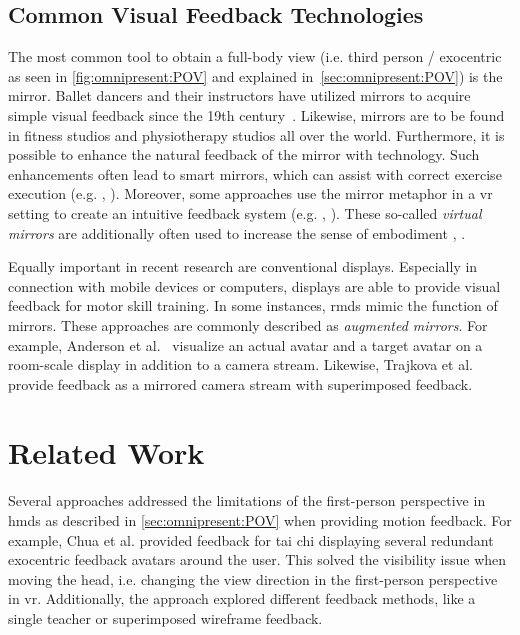 \subsection{Common Visual Feedback Technologies} %
The most common tool to obtain a full-body view (i.e. third person / exocentric as seen in \autoref{fig:omnipresent:POV} and explained in~\autoref{sec:omnipresent:POV}) is the mirror. Ballet dancers and their instructors have utilized mirrors to acquire simple visual feedback since the 19th century~\cite{desmond1997mim}. Likewise, mirrors are to be found in fitness studios and physiotherapy studios all over the world. Furthermore, it is possible to enhance the natural feedback of the mirror with technology. Such enhancements often lead to smart mirrors, which can assist with correct exercise execution (e.g. \cite{kim2020rtm}, \cite{park2021ued}). Moreover, some approaches use the mirror metaphor in a \acrshort{vr} setting to create an intuitive feedback system (e.g. \cite{waltemate2016tlp}, \cite{huelsmann2019ssp}). These so-called \emph{virtual mirrors} are additionally often used to increase the sense of embodiment \cite{inoue2021virtual}, \cite{gonzalesfranco2010contribution}.

Equally important in recent research are conventional displays. Especially in connection with mobile devices or computers, displays are able to provide visual feedback for motor skill training. In some instances, \acrshort{rmd}s mimic the function of mirrors. These approaches are commonly described as \emph{augmented mirrors}. For example, Anderson et al.~\cite{anderson2013youmove} visualize an actual avatar and a target avatar on a room-scale display in addition to a camera stream. Likewise, Trajkova et al.~\cite{trajkova2018ttb} provide feedback as a mirrored camera stream with superimposed feedback.

\section{Related Work}
Several approaches addressed the limitations of the first-person perspective in \acrshort{hmd}s as described in \autoref{sec:omnipresent:POV} when providing motion feedback. For example, Chua et al.\cite{chua2003tpt} provided feedback for tai chi displaying several redundant exocentric feedback avatars around the user. This solved the visibility issue when moving the head, i.e. changing the view direction in the first-person perspective in \acrshort{vr}. Additionally, the approach explored different feedback methods, like a single teacher or superimposed wireframe feedback.

